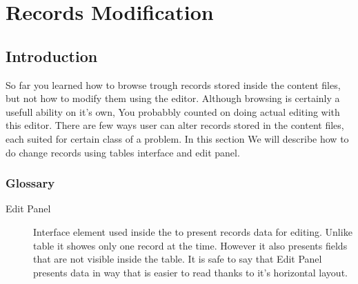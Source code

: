 \section{Records Modification}

\subsection{Introduction}
So far you learned how to browse trough records stored inside the content files, but not how to modify them using the \OCS{} editor. Although browsing is certainly a usefull ability on it's own, You probabbly counted on doing actual editing with this editor. There are few ways user can alter records stored in the content files, each suited for certain class of a problem. In this section We will describe how to do change records using tables interface and edit panel.

\subsubsection{Glossary}
\begin{description}
  \item[Edit Panel] Interface element used inside the \OCS{} to present records data for editing. Unlike table it showes only one record at the time. However it also presents fields that are not visible inside the table. It is safe to say that Edit Panel presents data in way that is easier to read thanks to it's horizontal layout.
\end{description}
